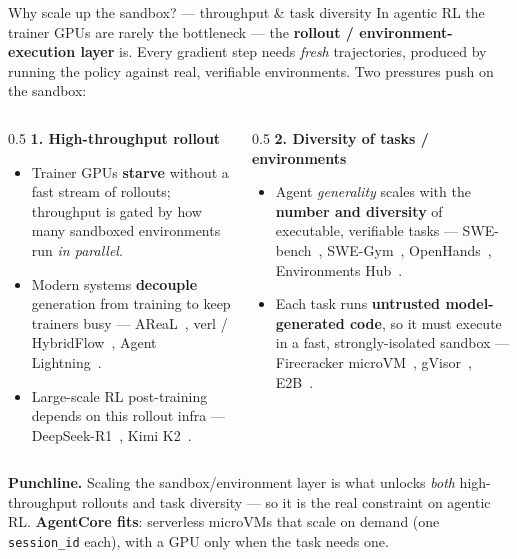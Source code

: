 \documentclass[aspectratio=169]{beamer}
\begin{document}
\begin{frame}{Why scale up the sandbox? --- throughput \& task diversity}
  \footnotesize In agentic RL the trainer GPUs are rarely the bottleneck --- the \textbf{rollout /
  environment-execution layer} is. Every gradient step needs \emph{fresh} trajectories, produced by
  running the policy against real, verifiable environments. Two pressures push on the sandbox:
  \vspace{0.2em}
  \begin{columns}[T]
    \begin{column}{0.5\textwidth}
      \textbf{1. High-throughput rollout}
      \begin{itemize}\setlength\itemsep{0.15em}
        \item Trainer GPUs \textbf{starve} without a fast stream of rollouts; throughput is gated by
          how many sandboxed environments run \emph{in parallel}.
        \item Modern systems \textbf{decouple} generation from training to keep trainers busy ---
          AReaL~\cite{areal}, verl / HybridFlow~\cite{verl}, Agent Lightning~\cite{al-paper}.
        \item Large-scale RL post-training depends on this rollout infra --- DeepSeek-R1~\cite{deepseekr1},
          Kimi K2~\cite{kimik2}.
      \end{itemize}
    \end{column}
    \begin{column}{0.5\textwidth}
      \textbf{2. Diversity of tasks / environments}
      \begin{itemize}\setlength\itemsep{0.15em}
        \item Agent \emph{generality} scales with the \textbf{number and diversity} of executable,
          verifiable tasks --- SWE-bench~\cite{swebench}, SWE-Gym~\cite{swegym},
          OpenHands~\cite{openhands}, Environments Hub~\cite{envhub}.
        \item Each task runs \textbf{untrusted model-generated code}, so it must execute in a fast,
          strongly-isolated sandbox --- Firecracker microVM~\cite{firecracker}, gVisor~\cite{gvisor}, E2B~\cite{e2b}.
      \end{itemize}
    \end{column}
  \end{columns}
  \vspace{0.3em}
  {\scriptsize \textbf{Punchline.} Scaling the sandbox/environment layer is what unlocks \emph{both}
  high-throughput rollouts and task diversity --- so it is the real constraint on agentic RL.
  \textbf{AgentCore fits}: serverless microVMs that scale on demand (one \texttt{session\_id} each),
  with a GPU only when the task needs one.}
\end{frame}
\end{document}
